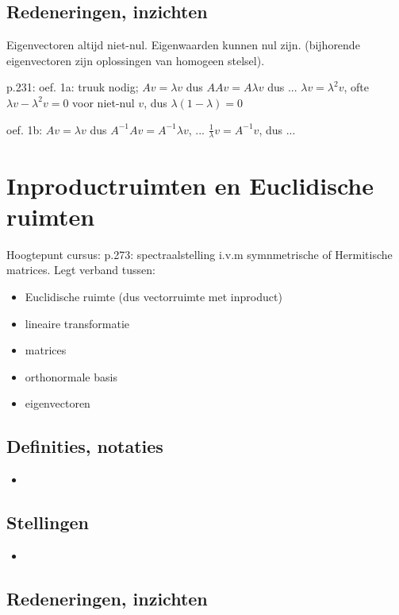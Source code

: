 \documentclass{article}
\begin{document}
\subsection{Redeneringen, inzichten}

Eigenvectoren altijd niet-nul. Eigenwaarden kunnen nul zijn. (bijhorende eigenvectoren zijn oplossingen van homogeen stelsel). 

p.231: oef. 1a: truuk nodig; $Av=\lambda v$ dus $AAv= A\lambda v$ dus ... $\lambda v = \lambda^2 v$, ofte  $\lambda v - \lambda^2 v = 0$ voor niet-nul $v$, dus $\lambda(1-\lambda)=0$

oef. 1b: $Av=\lambda v$ dus $A^{-1}Av = A^{-1} \lambda v$, ... $\frac{1}{\lambda}v= A^{-1}v$, dus ... 

\section{Inproductruimten en Euclidische ruimten}



Hoogtepunt cursus: p.273: spectraalstelling i.v.m symnmetrische of Hermitische matrices. 
Legt verband tussen: 

\begin{itemize}
    \item Euclidische ruimte (dus vectorruimte met inproduct)
    \item lineaire transformatie
    \item matrices
    \item orthonormale basis
    \item eigenvectoren
\end{itemize}


\subsection{Definities, notaties}
\begin{itemize}
    \item 
\end{itemize}

\subsection{Stellingen}
\begin{itemize}
    \item 
\end{itemize}

\subsection{Redeneringen, inzichten}
\end{document}
